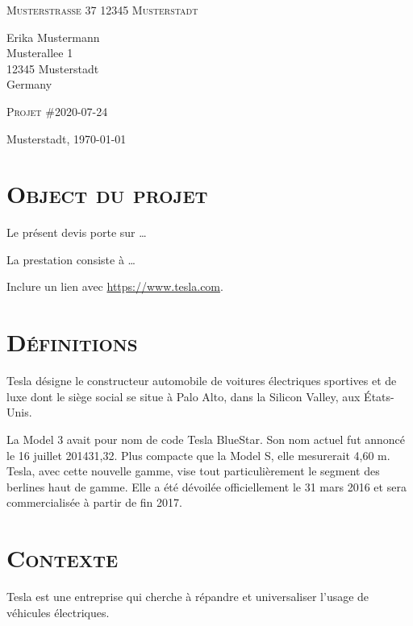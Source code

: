 \documentclass[10pt, a4paper]{article}
\begin{document}
\small
\ttfamily
\textsc{\textbf{}}
\textbullet{} \textsc{Musterstraße 37}
\textbullet{} \textsc{12345 Musterstadt}

\vspace{1em}

\normalsize \ttfamily
Erika Mustermann\\
Musterallee 1\\
12345 Musterstadt\\
Germany\\

\vspace{6em}
\rmfamily

\huge{\textsc{Projet \#2020-07-24} }

\begin{flushright}
  \small
  Musterstadt, \today
\end{flushright}

\vspace{1em}

\normalsize \rmfamily

    \section*{\textsc{Object du projet}}
    Le présent devis porte sur \ldots{}

    La prestation consiste à \ldots{}

    Inclure un lien avec \url{https://www.tesla.com}.
    \section*{\textsc{Définitions}}
    Tesla désigne le constructeur automobile de voitures électriques
    sportives et de luxe dont le siège social se situe à Palo Alto, dans
    la Silicon Valley, aux États-Unis.

    La Model 3 avait pour nom de code Tesla BlueStar. Son nom actuel fut
    annoncé le 16 juillet 201431,32. Plus compacte que la Model S, elle
    mesurerait 4,60 m. Tesla, avec cette nouvelle gamme, vise tout
    particulièrement le segment des berlines haut de gamme. Elle a été
    dévoilée officiellement le 31 mars 2016 et sera commercialisée à
    partir de fin 2017.
    \section*{\textsc{Contexte}}
    Tesla est une entreprise qui cherche à répandre et universaliser
    l'usage de véhicules électriques.
\end{document}

